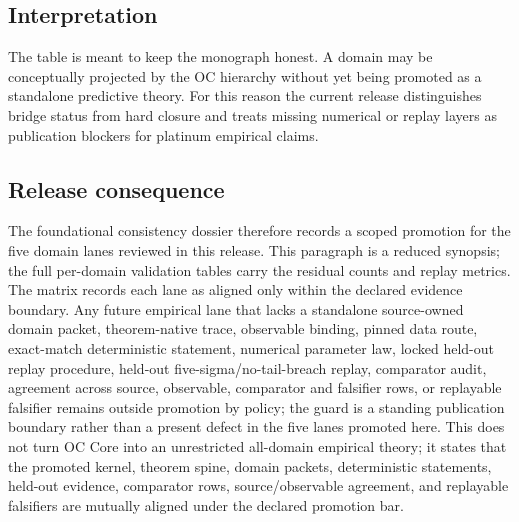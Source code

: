 \subsection{Interpretation}
The table is meant to keep the monograph honest. A domain may be conceptually projected by the OC hierarchy without yet being promoted as a standalone predictive theory.
For this reason the current release distinguishes bridge status from hard closure and treats missing numerical or replay layers as publication blockers for platinum empirical claims.

\subsection{Release consequence}
The foundational consistency dossier therefore records a scoped promotion for the five domain lanes reviewed in this release.
This paragraph is a reduced synopsis; the full per-domain validation tables carry the residual counts and replay metrics. The matrix records each lane as aligned only within the declared evidence boundary. Any future empirical lane that
lacks a standalone source-owned domain packet, theorem-native trace, observable
binding, pinned data route, exact-match deterministic statement, numerical
parameter law, locked held-out replay procedure, held-out five-sigma/no-tail-breach replay,
comparator audit, agreement across source, observable, comparator and
falsifier rows, or replayable falsifier remains
outside promotion by policy; the guard is a standing publication boundary
rather than a present defect in the five lanes promoted here.
This does not turn OC Core into an unrestricted all-domain empirical theory; it
states that the promoted kernel, theorem spine, domain packets, deterministic
statements, held-out evidence, comparator rows, source/observable agreement,
and replayable falsifiers are mutually aligned under the declared promotion
bar.
